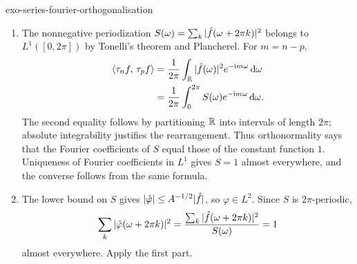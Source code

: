 \begin{correction}{exo-series-fourier-orthogonalisation}
\begin{enumerate}
\item The nonnegative periodization
$S(\omega)=\sum_k|\hat{f}(\omega+2\pi k)|^2$
belongs to $L^1([0,2\pi])$ by Tonelli's theorem and Plancherel. For $m=n-p$,
\begin{align}
\label{eqn-ortho-series-fourier}
 \langle \tau_nf,\,\tau_pf\rangle
 &=\frac1{2\pi}\int_{\mathbb{R}}|\hat{f}(\omega)|^2e^{-\mathrm{i} m\omega}\,\mathrm{d}\omega
 \nonumber\\
 &=\frac1{2\pi}\int_0^{2\pi}S(\omega)e^{-\mathrm{i} m\omega}\,\mathrm{d}\omega.
\end{align}
The second equality follows by partitioning $\mathbb{R}$ into intervals of length
$2\pi$; absolute integrability justifies the rearrangement.
Thus orthonormality says that the Fourier coefficients of $S$ equal those
of the constant function $1$. Uniqueness of Fourier coefficients in $L^1$
gives $S=1$ almost everywhere, and the converse follows from the same formula.
\item The lower bound on $S$ gives
$|\hat{\varphi}|\leq A^{-1/2}|\hat{f}|$, so $\varphi\in L^2$.
Since $S$ is $2\pi$-periodic,
\[
 \sum_k|\hat{\varphi}(\omega+2\pi k)|^2
 =\frac{\sum_k|\hat{f}(\omega+2\pi k)|^2}{S(\omega)}=1
\]
almost everywhere. Apply the first part.
\end{enumerate}
\end{correction}

